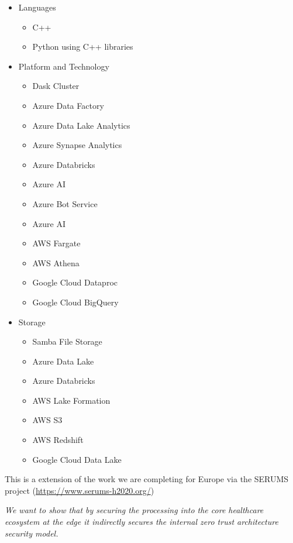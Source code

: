 \begin{Workpackage}{\thewpno}
\begin{Task}
\begin{itemize}
    \item Languages
        \begin{itemize}
            \item C++
            \item Python using C++ libraries
        \end{itemize}
    \item Platform and Technology
        \begin{itemize}
            \item Dask Cluster
            \item Azure Data Factory
            \item Azure Data Lake Analytics
            \item Azure Synapse Analytics
            \item Azure Databricks
            \item Azure AI
            \item Azure Bot Service
            \item Azure AI
            \item AWS Fargate
            \item AWS Athena
            \item Google Cloud Dataproc
            \item Google Cloud BigQuery
        \end{itemize}
    \item Storage
        \begin{itemize}
            \item Samba File Storage
            \item Azure Data Lake
            \item Azure Databricks
            \item AWS Lake Formation
            \item AWS S3
            \item AWS Redshift
            \item Google Cloud Data Lake
        \end{itemize}
\end{itemize}

This is a extension of the work we are completing for Europe via the SERUMS project (\url{https://www.serums-h2020.org/})


\emph{We want to show that by securing the processing into the core healthcare ecosystem at the edge it indirectly secures the internal zero trust architecture security model.}


\end{Task}
\end{Workpackage}
